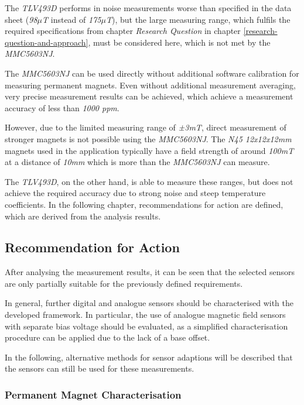 The \emph{TLV493D} performs in noise measurements worse than specified
in the data sheet (\emph{98\(\mu\)T} instead of \emph{175\(\mu\)T}), but
the large measuring range, which fulfils the required specifications
from chapter \emph{Research Question} in chapter
\ref{research-question-and-approach}, must be considered here, which is
not met by the \emph{MMC5603NJ}.

The \emph{MMC5603NJ} can be used directly without additional software
calibration for measuring permanent magnets. Even without additional
measurement averaging, very precise measurement results can be achieved,
which achieve a measurement accuracy of less than \emph{1000 \gls{ppm}}.

However, due to the limited measuring range of \emph{±3mT}, direct
measurement of stronger magnets is not possible using the
\emph{MMC5603NJ}. The \emph{N45 12x12x12mm} magnets used in the
application typically have a field strength of around \emph{100mT} at a
distance of \emph{10mm} which is more than the \emph{MMC5603NJ} can
measure.

The \emph{TLV493D}, on the other hand, is able to measure these ranges,
but does not achieve the required accuracy due to strong noise and steep
temperature coefficients. In the following chapter, recommendations for
action are defined, which are derived from the analysis results.

\hypertarget{recommendation-for-action}{%
\subsection{Recommendation for Action}\label{recommendation-for-action}}

After analysing the measurement results, it can be seen that the
selected sensors are only partially suitable for the previously defined
requirements.

In general, further digital and analogue sensors should be characterised
with the developed framework. In particular, the use of analogue
magnetic field sensors with separate bias voltage should be evaluated,
as a simplified characterisation procedure can be applied due to the
lack of a base offset.

In the following, alternative methods for sensor adaptions will be
described that the sensors can still be used for these measurements.

\hypertarget{permanent-magnet-characterisation}{%
\subsubsection{Permanent Magnet
Characterisation}\label{permanent-magnet-characterisation}}

